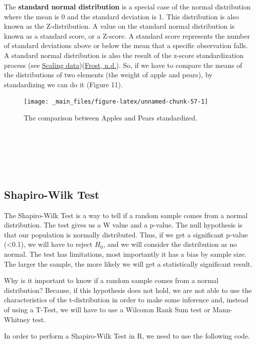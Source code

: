 \documentclass[
]{article}
\begin{document}
The \textbf{standard normal distribution} is a special case of the normal
distribution where the mean is 0 and the standard deviation is 1. This
distribution is also known as the Z-distribution. A value on the
standard normal distribution is known as a standard score, or a Z-score.
A standard score represents the number of standard deviations above or
below the mean that a specific observation falls. A standard normal
distribution is also the result of the z-score standardization process
(see \protect\hyperlink{scaling-data}{Scaling data})(\protect\hyperlink{ref-frost}{Frost, n.d.}). So, if we have to compare the means of the
distributions of two elements (the weight of apple and pears), by
standardizing we can do it (Figure 11).

\begin{figure}[H]

{\centering \texttt{[image: \_main\_files/figure-latex/unnamed-chunk-57-1]} 

}

\caption{The comparison between Apples and Pears standardized.}\label{fig:unnamed-chunk-57}
\end{figure}

~

~

~

\hypertarget{shapiro-wilk-test}{%
\subsection{Shapiro-Wilk Test}\label{shapiro-wilk-test}}

The Shapiro-Wilk Test is a way to tell if a random sample comes from a
normal distribution. The test gives us a W value and a p-value. The null
hypothesis is that our population is normally distributed. Thus, if we
get a significant p-value (\textless0.1), we will have to reject \(H_0\), and we
will consider the distribution as no normal. The test has limitations,
most importantly it has a bias by sample size. The larger the sample,
the more likely we will get a statistically significant result.

Why is it important to know if a random sample comes from a normal
distribution? Because, if this hypothesis does not hold, we are not able
to use the characteristics of the t-distribution in order to make some
inference and, instead of using a T-Test, we will have to use a Wilcoxon
Rank Sum test or Mann-Whitney test.

In order to perform a Shapiro-Wilk Test in R, we need to use the
following code.
\end{document}

